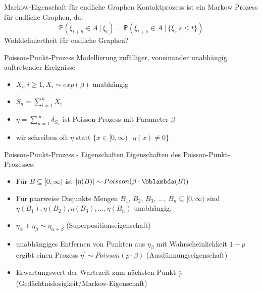 \documentclass[11pt]{beamer}
\begin{document}
\begin{frame}{Markow-Eigenschaft für endliche Graphen}
    Kontaktprozess ist ein Markow Prozess für endliche Graphen, da:
    \[
        \mathbb{P}(\xi_{t + h} \in A\ |\ \xi_{t}) = \mathbb{P}(\xi_{t + h} \in A\ |\ \{ \xi_s\ s \leq t \})
    \]
    Wohldefiniertheit f\"ur endliche Graphen? 
\end{frame}

\begin{frame}{Poisson-Punkt-Prozess}
    Modellierung zufälliger, voneinander unabhängig auftretender Ereignisse
    \begin{itemize}
        \item $X_i, i \geq 1, X_i \sim exp(\beta)$ unabhängig
        \item $S_n = \sum_{i = 1}^n X_i$
        \item $\eta = \sum_{n = 1}^\infty \delta_{S_n}$ ist Poisson Prozess mit Parameter $\beta$
        \item wir schreiben oft $\eta$ statt $\{x \in [0, \infty)\ |\ \eta(x) \not= 0 \}$
    \end{itemize}
\end{frame}
\begin{frame}{Poisson-Punkt-Prozess - Eigenschaften}
    Eigenschaften des Poisson-Punkt-Prozesses:
    \begin{itemize}
        \item <2-> Für $B \subseteq [0, \infty)$ ist $|\eta(B)| \sim Poisson(\beta \cdot \bblambda(B))$  
        \item <3-> Für paarweise Disjunkte Mengen $B_1$, $B_2$, $B_3$, ..., $B_n \subseteq [0, \infty)$ 
        sind $\eta(B_1), \eta(B_2), \eta(B_3), ..., \eta(B_n)$ unabhängig.
        \item <4-> $\eta_{\alpha} + \eta_\beta \sim \eta_{\alpha + \beta}$
        (Superpositionseigenschaft)
        \item <5-> unabh\"angiges Entfernen von Punkten aus $\eta_\beta$ mit Wahrscheinlichkeit $1 - p$ ergibt einen Prozess $\eta^\prime \sim Poisson(p \cdot \beta)$ (Ausdünnungseigenschaft)
        \item <6-> Erwartungswert der Wartezeit zum n\"achsten Punkt $\frac{1}{\beta}$ (Ged\"achtnislosigkeit/Markow-Eigenschaft)
    \end{itemize}
\end{frame}
\end{document}

